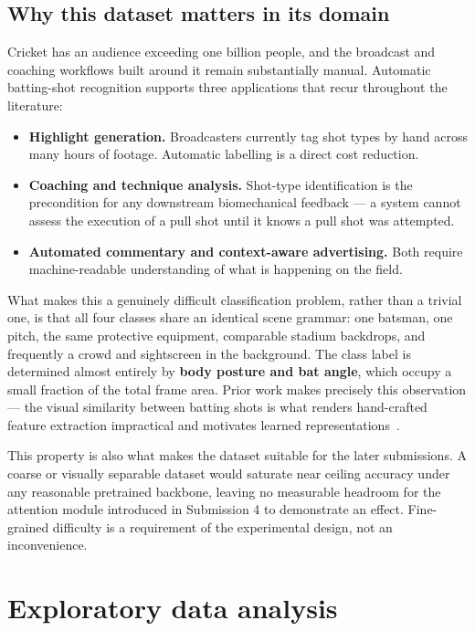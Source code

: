 \documentclass[11pt,a4paper]{article}
\begin{document}
\subsection{Why this dataset matters in its domain}

Cricket has an audience exceeding one billion people, and the broadcast and coaching
workflows built around it remain substantially manual. Automatic batting-shot
recognition supports three applications that recur throughout the literature:

\begin{itemize}
\item \textbf{Highlight generation.} Broadcasters currently tag shot types by hand
  across many hours of footage. Automatic labelling is a direct cost reduction.
\item \textbf{Coaching and technique analysis.} Shot-type identification is the
  precondition for any downstream biomechanical feedback --- a system cannot assess the
  execution of a pull shot until it knows a pull shot was attempted.
\item \textbf{Automated commentary and context-aware advertising.} Both require
  machine-readable understanding of what is happening on the field.
\end{itemize}

What makes this a genuinely difficult classification problem, rather than a trivial one,
is that all four classes share an identical scene grammar: one batsman, one pitch, the
same protective equipment, comparable stadium backdrops, and frequently a crowd and
sightscreen in the background. The class label is determined almost entirely by
\textbf{body posture and bat angle}, which occupy a small fraction of the total frame
area. Prior work makes precisely this observation --- the visual similarity between
batting shots is what renders hand-crafted feature extraction impractical and motivates
learned representations~\cite{sen2021}.

This property is also what makes the dataset suitable for the later submissions. A
coarse or visually separable dataset would saturate near ceiling accuracy under any
reasonable pretrained backbone, leaving no measurable headroom for the attention module
introduced in Submission 4 to demonstrate an effect. Fine-grained difficulty is a
requirement of the experimental design, not an inconvenience.

\section{Exploratory data analysis}
\end{document}
